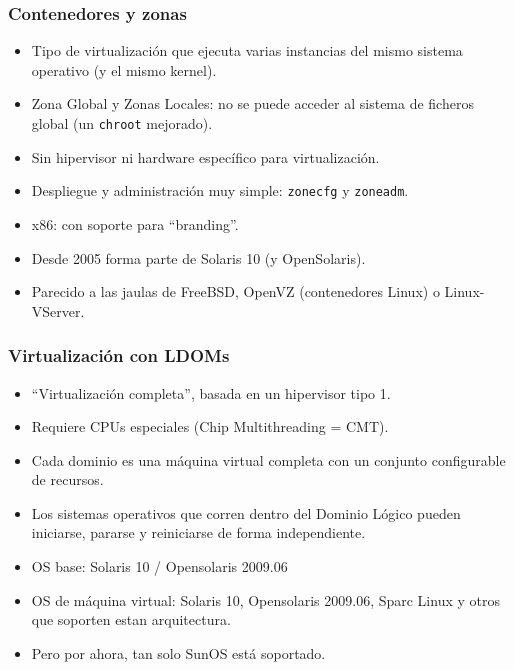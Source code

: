 \documentclass{beamer}
\begin{document}

\begin{frame}
\frametitle{Contenedores y zonas}

\begin{itemize}
\item Tipo de virtualización que ejecuta varias instancias del mismo sistema operativo (y el mismo kernel).
\item Zona Global y Zonas Locales: no se puede acceder al sistema de ficheros global (un \texttt{chroot} mejorado).
\item Sin hipervisor ni hardware específico para virtualización.
\item Despliegue y administración muy simple: \texttt{zonecfg} y \texttt{zoneadm}.
\item x86: con soporte para ``branding''.
\item Desde 2005 forma parte de Solaris 10 (y OpenSolaris).
\item Parecido a las jaulas de FreeBSD, OpenVZ (contenedores Linux) o Linux-VServer.
\end{itemize}

\end{frame}



\begin{frame}
\frametitle{Virtualización con LDOMs}

\begin{itemize}
\item ``Virtualización completa'', basada en un hipervisor tipo 1.
\item Requiere CPUs especiales (Chip Multithreading = CMT).
\item Cada dominio es una máquina virtual completa con un conjunto configurable de recursos.
\item Los sistemas operativos que corren dentro del Dominio Lógico pueden iniciarse, pararse y reiniciarse de forma independiente.
\item OS base: Solaris 10 / Opensolaris 2009.06
\item OS de máquina virtual: Solaris 10, Opensolaris 2009.06, Sparc Linux y otros que soporten estan arquitectura.
\item Pero por ahora, tan solo SunOS está soportado.
\end{itemize}

\end{frame}
\end{document}
